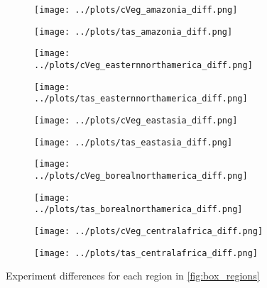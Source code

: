 \documentclass[]{article}
\begin{document}
\begin{figure}[H]
    \centering
    \begin{subfigure}[b]{0.4\linewidth}
        \texttt{[image: ../plots/cVeg\_amazonia\_diff.png]}
    \end{subfigure}
    \begin{subfigure}[b]{0.4\linewidth}
        \texttt{[image: ../plots/tas\_amazonia\_diff.png]}
    \end{subfigure}
    \begin{subfigure}[b]{0.4\linewidth}
        \texttt{[image: ../plots/cVeg\_easternnorthamerica\_diff.png]}
    \end{subfigure}
    \begin{subfigure}[b]{0.4\linewidth}
        \texttt{[image: ../plots/tas\_easternnorthamerica\_diff.png]}
    \end{subfigure}
    \begin{subfigure}[b]{0.4\linewidth}
        \texttt{[image: ../plots/cVeg\_eastasia\_diff.png]}
    \end{subfigure}
    \begin{subfigure}[b]{0.4\linewidth}
        \texttt{[image: ../plots/tas\_eastasia\_diff.png]}
    \end{subfigure}
    \begin{subfigure}[b]{0.4\linewidth}
        \texttt{[image: ../plots/cVeg\_borealnorthamerica\_diff.png]}
    \end{subfigure}
    \begin{subfigure}[b]{0.4\linewidth}
        \texttt{[image: ../plots/tas\_borealnorthamerica\_diff.png]}
    \end{subfigure}
    \begin{subfigure}[b]{0.4\linewidth}
        \texttt{[image: ../plots/cVeg\_centralafrica\_diff.png]}
    \end{subfigure}
    \begin{subfigure}[b]{0.4\linewidth}
        \texttt{[image: ../plots/tas\_centralafrica\_diff.png]}
    \end{subfigure}
    \caption{Experiment differences for each region in \ref{fig:box_regions}}
    \label{fig:aus_region_cveg_tas}
\end{figure}
\end{document}
